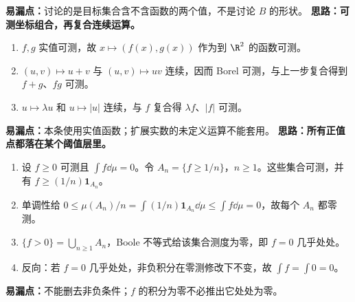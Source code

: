 \textbf{易漏点：}讨论的是目标集合含不含函数的两个值，不是讨论 $B$ 的形状。
\textbf{思路：可测坐标组合，再复合连续运算。}
\begin{enumerate}
\item $f,g$ 实值可测，故 $x\mapsto(f(x),g(x))$ 作为到 $\R^2$ 的函数可测。
\item $(u,v)\mapsto u+v$ 与 $(u,v)\mapsto uv$ 连续，因而 Borel 可测，与上一步复合得到 $f+g$、$fg$ 可测。
\item $u\mapsto\lambda u$ 和 $u\mapsto|u|$ 连续，与 $f$ 复合得 $\lambda f$、$|f|$ 可测。
\end{enumerate}
\textbf{易漏点：}本条使用实值函数；扩展实数的未定义运算不能套用。
\textbf{思路：所有正值点都落在某个阈值层里。}
\begin{enumerate}
\item 设 $f\ge0$ 可测且 $\int f\dd\mu=0$。令 $A_n=\{f\ge1/n\}$，$n\ge1$。这些集合可测，并有 $f\ge(1/n)\mathbf1_{A_n}$。
\item 单调性给 $0\le\mu(A_n)/n=\int(1/n)\mathbf1_{A_n}\dd\mu\le\int f\dd\mu=0$，故每个 $A_n$ 都零测。
\item $\{f>0\}=\bigcup_{n\ge1}A_n$，Boole 不等式给该集合测度为零，即 $f=0$ 几乎处处。
\item 反向：若 $f=0$ 几乎处处，非负积分在零测修改下不变，故 $\int f=\int0=0$。
\end{enumerate}
\textbf{易漏点：}不能删去非负条件；$f$ 的积分为零不必推出它处处为零。
